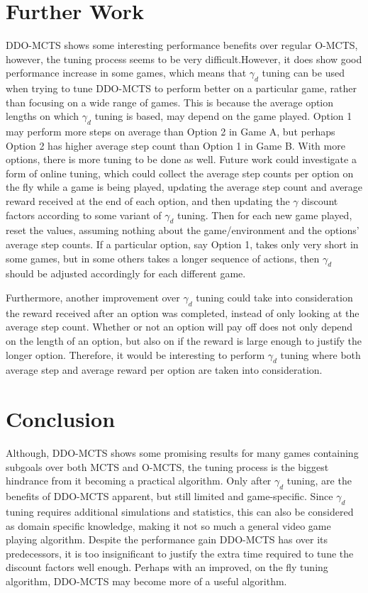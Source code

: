 \documentclass[12pt,a4paper]{article}
\begin{document}
\begin{multicols}{2}
\section{Further Work}
DDO-MCTS shows some interesting performance benefits over regular O-MCTS, however, the tuning process seems to be very difficult.However, it does show good performance increase in some games, which means that $\gamma_d$ tuning can be used when trying to tune DDO-MCTS to perform better on a particular game, rather than focusing on a wide range of games. This is because the average option lengths on which $\gamma_d$ tuning is based, may depend on the game played. Option 1 may perform more steps on average than Option 2 in Game A, but perhaps Option 2 has higher average step count than Option 1 in Game B.  With more options, there is more tuning to be done as well. Future work could investigate a form of online tuning, which could collect the average step counts per option on the fly while a game is being played, updating the average step count and average reward received at the end of each option, and then updating the $\gamma$ discount factors according to some variant of $\gamma_d$ tuning. Then for each new game played, reset the values, assuming nothing about the game/environment and the options' average step counts. If a particular option, say Option 1, takes only very short in some games, but in some others takes a longer sequence of actions, then $\gamma_d$ should be adjusted accordingly for each different game.

Furthermore, another improvement over $\gamma_d$ tuning could take into consideration the reward received after an option was completed, instead of only looking at the average step count. Whether or not an option will pay off does not only depend on the length of an option, but also on if the reward is large enough to justify the longer option. Therefore, it would be interesting to perform $\gamma_d$ tuning where both average step and average reward per option are taken into consideration.

\section{Conclusion}
Although, DDO-MCTS shows some promising results for many games containing subgoals over both MCTS and O-MCTS, the tuning process is the biggest hindrance from it becoming a practical algorithm. Only after $\gamma_d$ tuning, are the benefits of DDO-MCTS apparent, but still limited and game-specific. Since $\gamma_d$ tuning requires additional simulations and statistics, this can also be considered as domain specific knowledge, making it not so much a general video game playing algorithm. Despite the performance gain DDO-MCTS has over its predecessors, it is too insignificant to justify the extra time required to tune the discount factors well enough. Perhaps with an improved, on the fly tuning algorithm, DDO-MCTS may become more of a useful algorithm.

\printbibliography

\end{multicols}
\end{document}
